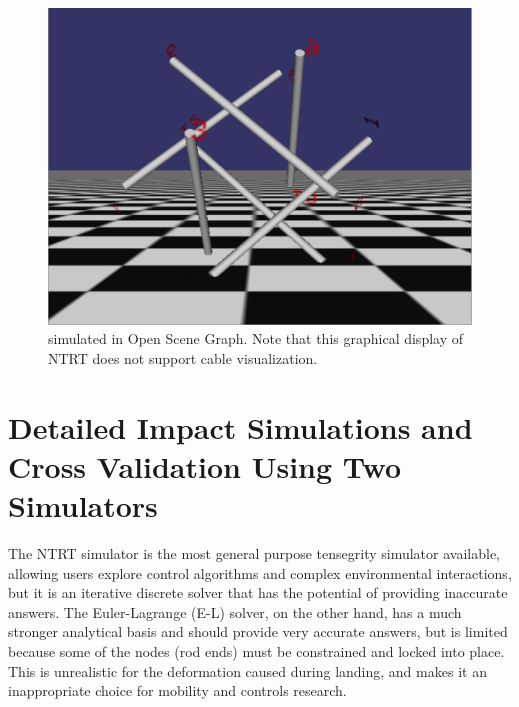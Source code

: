\begin{figure}[th]
      \centering
      \includegraphics[width=0.8\columnwidth]{tex/img/OSG_sb}
      \caption{\SB{} simulated in Open Scene Graph. Note that this graphical display of NTRT does not support cable visualization.}
      \label{fig:OSG_SB}
\end{figure}

\section{Detailed Impact Simulations and Cross Validation Using Two Simulators}
The NTRT simulator is the most general purpose tensegrity simulator available, allowing users explore control algorithms and complex environmental interactions, but it is an iterative discrete solver that has the potential of providing inaccurate answers.  The Euler-Lagrange (E-L) solver, on the other hand, has a much stronger analytical basis and should provide very accurate answers, but is limited because some of the nodes (rod ends) must be constrained and locked into place.  This is unrealistic for the deformation caused during landing, and makes it an inappropriate choice for mobility and controls research.

